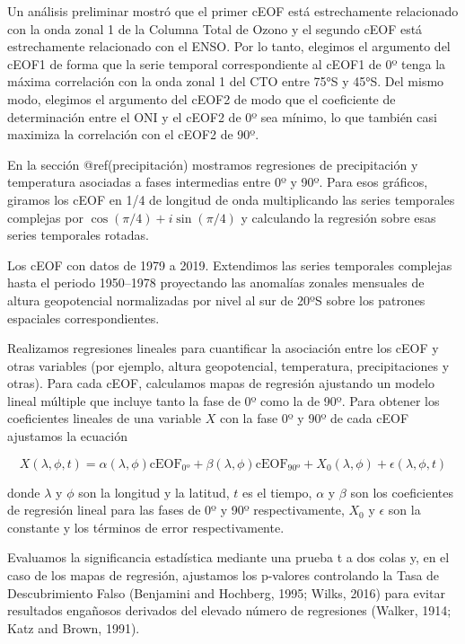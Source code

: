 \documentclass[12pt,oneside]{reedthesis}
\begin{document}
Un análisis preliminar mostró que el primer cEOF está estrechamente relacionado con la onda zonal 1 de la Columna Total de Ozono y el segundo cEOF está estrechamente relacionado con el ENSO.
Por lo tanto, elegimos el argumento del cEOF1 de forma que la serie temporal correspondiente al cEOF1 de 0º tenga la máxima correlación con la onda zonal 1 del CTO entre 75°S y 45°S.
Del mismo modo, elegimos el argumento del cEOF2 de modo que el coeficiente de determinación entre el ONI y el cEOF2 de 0º sea mínimo, lo que también casi maximiza la correlación con el cEOF2 de 90º.

En la sección @ref(precipitación) mostramos regresiones de precipitación y temperatura asociadas a fases intermedias entre 0º y 90º.
Para esos gráficos, giramos los cEOF en 1/4 de longitud de onda multiplicando las series temporales complejas por \(\cos(\pi/4) + i\sin(\pi/4)\) y calculando la regresión sobre esas series temporales rotadas.

Los cEOF con datos de 1979 a 2019.
Extendimos las series temporales complejas hasta el periodo 1950--1978 proyectando las anomalías zonales mensuales de altura geopotencial normalizadas por nivel al sur de 20ºS sobre los patrones espaciales correspondientes.

Realizamos regresiones lineales para cuantificar la asociación entre los cEOF y otras variables (por ejemplo, altura geopotencial, temperatura, precipitaciones y otras).
Para cada cEOF, calculamos mapas de regresión ajustando un modelo lineal múltiple que incluye tanto la fase de 0º como la de 90º.
Para obtener los coeficientes lineales de una variable \(X\) con la fase 0º y 90º de cada cEOF ajustamos la ecuación

\begin{equation}
X(\lambda, \phi, t) = \alpha(\lambda, \phi) \operatorname{cEOF_{0º}} + \beta(\lambda, \phi) \operatorname{cEOF_{90º}} + X_0(\lambda, \phi) + \epsilon(\lambda, \phi, t)
\label{eq:multiple-regression}
\end{equation}

donde \(\lambda\) y \(\phi\) son la longitud y la latitud, \(t\) es el tiempo, \(\alpha\) y \(\beta\) son los coeficientes de regresión lineal para las fases de 0º y 90º respectivamente, \(X_0\) y \(\epsilon\) son la constante y los términos de error respectivamente.

Evaluamos la significancia estadística mediante una prueba t a dos colas y, en el caso de los mapas de regresión, ajustamos los p-valores controlando la Tasa de Descubrimiento Falso (Benjamini and Hochberg, 1995; Wilks, 2016) para evitar resultados engañosos derivados del elevado número de regresiones (Walker, 1914; Katz and Brown, 1991).
\end{document}
